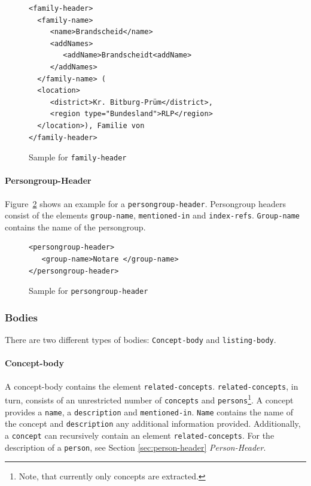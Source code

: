 \begin{figure}[H]
\centering
\begin{verbatim}
<family-header>
  <family-name>
     <name>Brandscheid</name>
     <addNames>
        <addName>Brandscheidt<addName>
     </addNames>
  </family-name> (
  <location>
     <district>Kr. Bitburg-Prüm</district>,
     <region type="Bundesland">RLP</region>
  </location>), Familie von
</family-header>
\end{verbatim}
\caption{Sample for \texttt{family-header}}
\label{fig:family-header-xml}
\end{figure}

\paragraph{Persongroup-Header}
Figure~\ref{fig:persongroup-header-xml} shows an example for a
\texttt{persongroup-header}. Persongroup headers consist of the
elements \texttt{group-name}, \texttt{mentioned-in} and
\texttt{index-refs}. \texttt{Group-name} contains the name of the
persongroup.

\begin{figure}[H]
\centering
\begin{verbatim}
<persongroup-header>
   <group-name>Notare </group-name>
</persongroup-header>
\end{verbatim}
\caption{Sample for \texttt{persongroup-header}}
\label{fig:persongroup-header-xml}
\end{figure}

\subsubsection{Bodies}
There are two different types of bodies: \texttt{Concept-body} and
\texttt{listing-body}.

\paragraph{Concept-body}
A concept-body contains the element \texttt{related-concepts}.
\texttt{related-concepts}, in turn, consists of an unrestricted number
of \texttt{concepts} and \texttt{persons}\footnote{Note, that
  currently only concepts are extracted.}. A concept provides a
\texttt{name}, a \texttt{description} and \texttt{mentioned-in}.
\texttt{Name} contains the name of the concept and
\texttt{description} any additional information provided.
Additionally, a \texttt{concept} can recursively contain an element
\texttt{related-concepts}. For the description of a \texttt{person},
see Section \ref{sec:person-header} \textit{Person-Header}.

